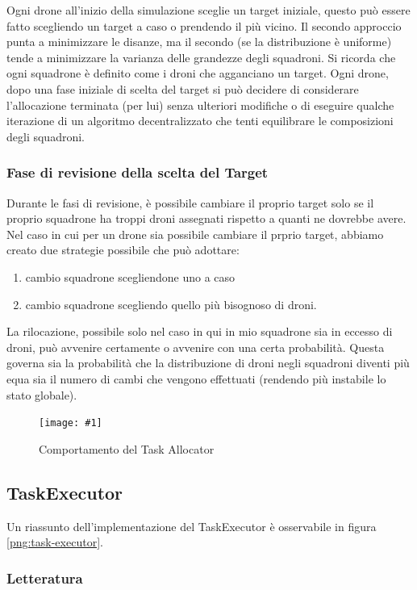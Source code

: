 \documentclass[a4paper,11pt,oneside, table]{article}
\newcommand{\putimage}[4] {
	\begin{figure}[H]
	    \centering
	    \texttt{[image: \#1]}
	    \caption{#2}\label{#3}
	\end{figure}
}
\begin{document}
Ogni drone all'inizio della simulazione sceglie un target iniziale, questo pu\`o essere fatto scegliendo un target a caso o prendendo il pi\`u vicino.
Il secondo approccio punta a minimizzare le disanze, ma il secondo (se la distribuzione \`e uniforme) tende a minimizzare la varianza delle grandezze degli squadroni.
Si ricorda che ogni squadrone \`e definito come i droni che agganciano un target.
Ogni drone, dopo una fase iniziale di scelta del target si pu\`o decidere di considerare l'allocazione terminata (per lui) senza ulteriori modifiche o di eseguire qualche iterazione di un algoritmo decentralizzato che tenti equilibrare le composizioni degli squadroni. 

\subsubsection{Fase di revisione della scelta del Target}

Durante le fasi di revisione, è possibile cambiare il proprio target solo se il proprio squadrone ha troppi droni assegnati rispetto a quanti ne dovrebbe avere.
Nel caso in cui per un drone sia possibile cambiare il prprio target, abbiamo creato due  strategie possibile che può adottare:
\begin{enumerate}
    \item cambio squadrone scegliendone uno a caso
    \item cambio squadrone scegliendo quello più bisognoso di droni.
\end{enumerate}

La rilocazione, possibile solo nel caso in qui in mio squadrone sia in eccesso di droni,  pu\`o avvenire certamente o avvenire con una certa probabilit\`a. Questa governa sia la probabilit\`a che la distribuzione di droni negli squadroni diventi pi\`u equa sia il numero di cambi che vengono effettuati (rendendo pi\`u instabile lo stato globale).

\putimage{images/task-allocator.png}{Comportamento del Task Allocator}{png:task-allocator}{0.99}

\subsection{TaskExecutor}

Un riassunto dell'implementazione del TaskExecutor \`e osservabile in figura \ref{png:task-executor}.

\subsubsection{Letteratura}
\end{document}

